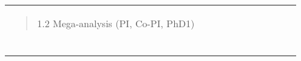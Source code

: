 \begin{longtable}[]{@{}lllllllllll@{}}
\begin{minipage}[t]{0.07\columnwidth}
\begin{quote}
1.2 Mega-analysis (PI, Co-PI, PhD1) \end{quote}\strut \end{minipage} & \begin{minipage}[t]{0.07\columnwidth}\raggedright \strut \end{minipage} & \begin{minipage}[t]{0.07\columnwidth}\raggedright \strut \end{minipage} & \begin{minipage}[t]{0.07\columnwidth}\raggedright \strut \end{minipage} & \begin{minipage}[t]{0.07\columnwidth}\raggedright \strut \end{minipage} & \begin{minipage}[t]{0.07\columnwidth}\raggedright \strut \end{minipage} & \begin{minipage}[t]{0.07\columnwidth}\raggedright \strut \end{minipage} & \begin{minipage}[t]{0.07\columnwidth}\raggedright \strut \end{minipage} & \begin{minipage}[t]{0.07\columnwidth}\raggedright \strut \end{minipage} & \begin{minipage}[t]{0.07\columnwidth}\raggedright \strut \end{minipage} & \begin{minipage}[t]{0.07\columnwidth}\raggedright \strut \end{minipage}\tabularnewline \begin{minipage}[t]{0.07\columnwidth}\raggedright \begin{quote}

\end{quote}
\end{minipage}
\end{longtable}
